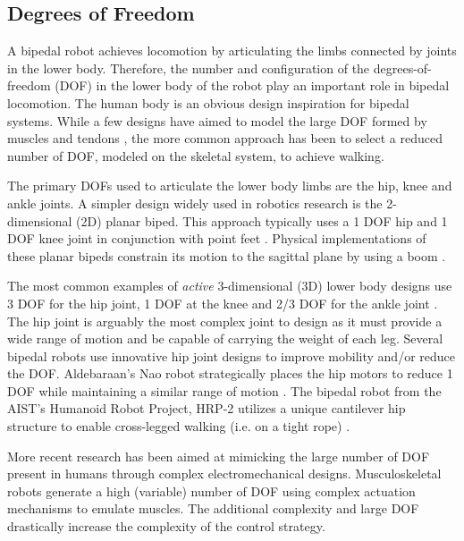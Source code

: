 \subsection{Degrees of Freedom} %
\label{sub:related_degrees_of_freedom}
A bipedal robot achieves locomotion by articulating the limbs connected by joints in the lower body. Therefore, the number and configuration of the degrees-of-freedom (DOF) in the lower body of the robot play an important role in bipedal locomotion. The human body is an obvious design inspiration for bipedal systems. While a few designs have aimed to model the large DOF formed by muscles and tendons \cite{Mizuuchi:2007em,Osada:2010cj}, the more common approach has been to select a reduced number of DOF, modeled on the skeletal system, to achieve walking. 

The primary DOFs used to articulate the lower body limbs are the hip, knee and ankle joints. A simpler design widely used in robotics research is the 2-dimensional (2D) planar biped. This approach typically uses a 1 DOF hip and 1 DOF knee joint in conjunction with point feet \cite{tzafestas1996robust}. Physical implementations of these planar bipeds constrain its motion to the sagittal plane by using a boom \cite{chevallereau2000design,pratt2001virtual,Wight:2008vt}. 

The most common examples of \emph{active} 3-dimensional (3D) lower body designs use 3 DOF for the hip joint, 1 DOF at the knee and 2/3 DOF for the ankle joint \cite{Hirai1998,IllWooPark:2005et,Kaneko:2004wq,Ogura:2006bm,yamaguchi1999}. The hip joint is arguably the most complex joint to design as it must provide a wide range of motion and be capable of carrying the weight of each leg. Several bipedal robots use innovative hip joint designs to improve mobility and/or reduce the DOF. Aldebaraan's Nao robot strategically places the hip motors to reduce 1 DOF while maintaining a similar range of motion \cite{Gouaillier:2008ug}. The bipedal robot from the AIST's Humanoid Robot Project, HRP-2 utilizes a unique cantilever hip structure to enable cross-legged walking (i.e. on a tight rope) \cite{Kaneko:2004wq}. 

More recent research has been aimed at mimicking the large number of DOF present in humans through complex electromechanical designs. Musculoskeletal robots \cite{Mizuuchi:2007em,Osada:2010cj} generate a high (variable) number of DOF using complex actuation mechanisms to emulate muscles. The additional complexity and large DOF drastically increase the complexity of the control strategy. 

